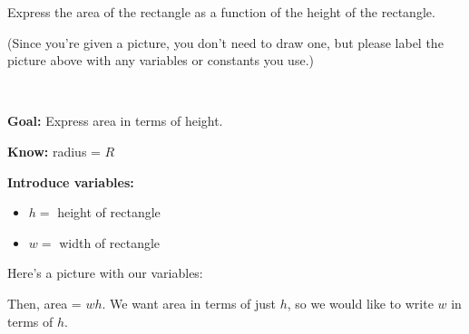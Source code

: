 \documentclass{article}
\begin{document}
\begin{enumerate}[resume]
\begin{enumerate}
    \begin{problem}[\newpage]
      Express the area of the rectangle as a function of the height of the rectangle.

      (Since you're given a picture, you don't need to draw one, but please label the picture above with any variables or constants you use.)
    \end{problem}

    \begin{solution}\

      \textbf{Goal:} Express area in terms of height.

      \textbf{Know:} radius = $R$

      \textbf{Introduce variables:}
      \begin{itemize}[nosep]
      \item $h = $ height of rectangle
      \item $w = $ width of rectangle 
      \end{itemize}

      Here's a picture with our variables:
      \begin{center}
      \end{center}
      Then, area = $wh$. We want area in terms of just $h$, so we would like to write $w$ in terms of $h$.


\end{solution}
\end{enumerate}
\end{enumerate}
\end{document}
